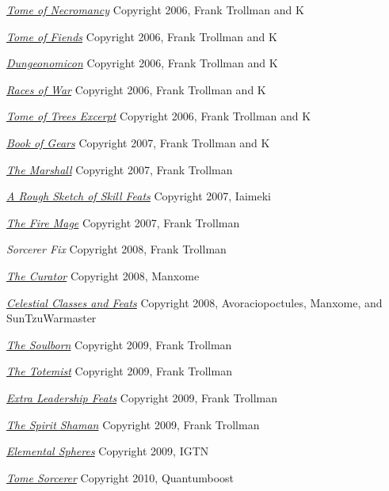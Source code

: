 \begin{small}
\begin{enumerate}
\href{http://www.tgdmb.com/viewtopic.php?t=34248}{\textit{Tome of Necromancy}} Copyright 2006, Frank Trollman and K

\href{http://www.tgdmb.com/viewtopic.php?t=28828}{\textit{Tome of Fiends}} Copyright 2006, Frank Trollman and K

\href{http://www.tgdmb.com/viewtopic.php?t=28547}{\textit{Dungeonomicon}} Copyright 2006, Frank Trollman and K

\href{http://www.tgdmb.com/viewtopic.php?t=33294}{\textit{Races of War}} Copyright 2006, Frank Trollman and K

\href{http://www.tgdmb.com/viewtopic.php?t=33294}{\textit{Tome of Trees Excerpt}} Copyright 2006, Frank Trollman and K

\href{http://www.tgdmb.com/viewtopic.php?t=35813}{\textit{Book of Gears}} Copyright 2007, Frank Trollman and K

\href{http://www.tgdmb.com/viewtopic.php?p=24348#24348}{\textit{The Marshall}} Copyright 2007, Frank Trollman

\href{http://www.tgdmb.com/viewtopic.php?p=29298}{\textit{A Rough Sketch of Skill Feats}} Copyright 2007, Iaimeki

\href{http://www.tgdmb.com/viewtopic.php?p=40226#40226}{\textit{The Fire Mage}} Copyright 2007, Frank Trollman

\textit{Sorcerer Fix} Copyright 2008, Frank Trollman

\href{http://www.tgdmb.com/viewtopic.php?t=49091}{\textit{The Curator}} Copyright 2008, Manxome

\href{http://www.tgdmb.com/viewtopic.php?t=49848}{\textit{Celestial Classes and Feats}} Copyright 2008, Avoraciopoctules, Manxome, and SunTzuWarmaster

\href{http://www.tgdmb.com/viewtopic.php?t=50472}{\textit{The Soulborn}} Copyright 2009, Frank Trollman

\href{http://www.tgdmb.com/viewtopic.php?t=50483}{\textit{The Totemist}} Copyright 2009, Frank Trollman

\href{http://tgdmb.com/viewtopic.php?t=50544}{\textit{Extra Leadership Feats}} Copyright 2009, Frank Trollman

\href{http://www.tgdmb.com/viewtopic.php?p=105974#105974}{\textit{The Spirit Shaman}} Copyright 2009, Frank Trollman

\href{http://dndwiki.com/wiki/Elemental_Spheres_(3.5e_Other)}{\textit{Elemental Spheres}} Copyright 2009, IGTN

\href{http://dndwiki.com/wiki/Sorcerer,_Tome_(3.5e_Class)}{\textit{Tome Sorcerer}} Copyright 2010,  Quantumboost


\end{enumerate}
\end{small}
